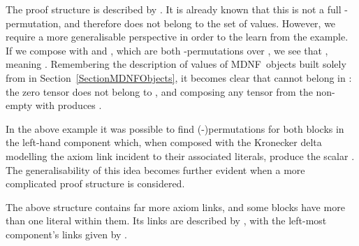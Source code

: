 \documentclass{LMCS}
\theoremstyle{plain}\newtheorem*{cLm}{Claim}
\newcommand{\p}{} \newcommand{\N}{\mathbb{N}}
\begin{document}
  \p The proof structure is described by . It is already known that this is not a full -permutation, and therefore does not belong to the set of values. However, we require a more generalisable perspective in order to the learn from the example. If we compose  with  and , which are both -permutations over , we see that , meaning . Remembering the description of values of MDNF~objects built solely from  in Section~\ref{SectionMDNFObjects}, it becomes clear that  cannot belong in : the zero tensor does not belong to , and composing any tensor from the non-empty  with  produces .
  
  \p In the above example it was possible to find (-)permutations for both blocks in the left-hand component which, when composed with the Kronecker delta modelling the axiom link incident to their associated literals, produce the scalar . The generalisability of this idea becomes further evident when a more complicated proof structure is considered. 
  
  \begin{center} \vspace{5mm}
 \vspace{5mm}
\end{center}  
  The above structure contains far more axiom links, and some blocks have more than one literal within them. Its links are described by , with the left-most component's links given by .
  
\end{document}

